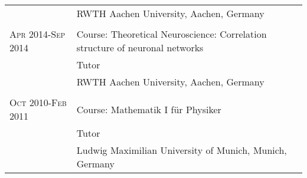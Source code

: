 \begin{longtable}{>{\hfill}p{3.3cm}|p{12.0cm}}
  & \footnotesize RWTH Aachen University, Aachen, Germany \\
  \multicolumn{2}{c}{} \\
  \textsc{Apr} 2014-\textsc{Sep} 2014 & Course: Theoretical Neuroscience: Correlation structure of neuronal networks \\ 
  & \footnotesize Tutor \\
  & \footnotesize RWTH Aachen University, Aachen, Germany \\
  \multicolumn{2}{c}{} \\
  \textsc{Oct} 2010-\textsc{Feb} 2011 & Course: Mathematik I f\"ur Physiker \\
  & \footnotesize Tutor \\
  & \footnotesize Ludwig Maximilian University of Munich, Munich, Germany \\
\end{longtable}
